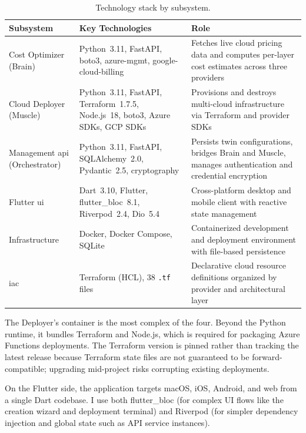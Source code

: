 \begin{table}[ht]
    \centering
    \caption{Technology stack by subsystem.}
    \label{tab:tech-stack}
    \begin{tabularx}{\textwidth}{l l X}
        \toprule
        \textbf{Subsystem} & \textbf{Key Technologies} & \textbf{Role} \\
        \midrule
        Cost Optimizer (Brain) & Python~3.11, FastAPI, boto3, azure-mgmt, google-cloud-billing & Fetches live cloud pricing data and computes per-layer cost estimates across three providers \\
        Cloud Deployer (Muscle) & Python~3.11, FastAPI, Terraform~1.7.5, Node.js~18, boto3, Azure SDKs, GCP SDKs & Provisions and destroys multi-cloud infrastructure via Terraform and provider SDKs \\
        Management \gls{api} (Orchestrator) & Python~3.11, FastAPI, SQLAlchemy~2.0, Pydantic~2.5, cryptography & Persists twin configurations, bridges Brain and Muscle, manages authentication and credential encryption \\
        Flutter \gls{ui} & Dart~3.10, Flutter, flutter\_bloc~8.1, Riverpod~2.4, Dio~5.4 & Cross-platform desktop and mobile client with reactive state management \\
        Infrastructure & Docker, Docker Compose, SQLite & Containerized development and deployment environment with file-based persistence \\
        \gls{iac} & Terraform (HCL), 38 \texttt{.tf} files & Declarative cloud resource definitions organized by provider and architectural layer \\
        \bottomrule
    \end{tabularx}
\end{table}

The Deployer's container is the most complex of the four. Beyond the Python runtime, it bundles Terraform and Node.js, which is required for packaging Azure Functions deployments. The Terraform version is pinned rather than tracking the latest release because Terraform state files are not guaranteed to be forward-compatible; upgrading mid-project risks corrupting existing deployments. %

On the Flutter side, the application targets macOS, iOS, Android, and web from a single Dart codebase. I use both flutter\_bloc (for complex UI flows like the creation wizard and deployment terminal) and Riverpod (for simpler dependency injection and global state such as API service instances). %

